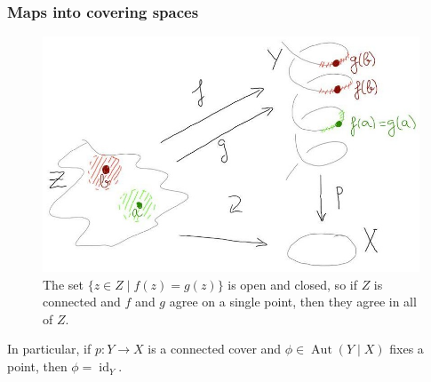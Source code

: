 \documentclass[notheorems, hyperref={backref}]{beamer}
\DeclareMathOperator{\id}{id}
\DeclareMathOperator{\Aut}{Aut}
\newcommand{\act}{\mbox{ }\rotatebox[origin=c]{-120}{$\circlearrowright$}}
\begin{document}
\begin{frame}
    \frametitle{Maps into covering spaces} 
    \begin{figure}[htp] 
	\centering
	\includegraphics[scale=.25]{pictures/lemma.jpg}
	\caption{The set $\{z\in Z\mid f(z)=g(z)\}$ is open and closed, so if $Z$ is connected and $f$ and $g$ agree on a single point, then they agree in all of $Z$.}
    \end{figure}
    \pause
    In particular, if $p\colon Y\to X$ is a connected cover and $\phi\in \Aut(Y\mid X)$ fixes a point, then $\phi=\id_{Y}$.
\end{frame}

%
\end{document}
